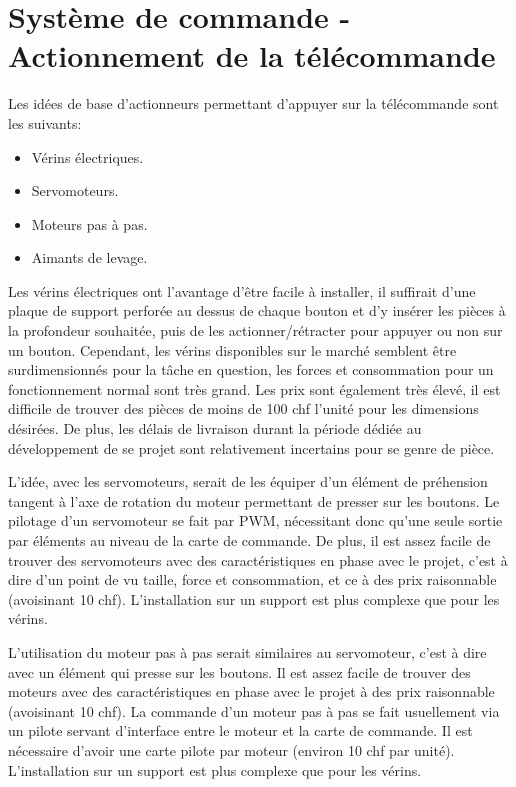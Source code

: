 \newpage
\section{Système de commande - Actionnement de la télécommande}
Les idées de base d'actionneurs permettant d'appuyer sur la télécommande sont les suivants:
\begin{itemize}
    \item Vérins électriques.
    \item Servomoteurs.
    \item Moteurs pas à pas.
    \item Aimants de levage.
\end{itemize}

Les vérins électriques ont l'avantage d'être facile à installer, il suffirait d'une plaque de support perforée au dessus de chaque bouton et d'y insérer
les pièces à la profondeur souhaitée, puis de les actionner/rétracter pour appuyer ou non sur un bouton. Cependant, les vérins disponibles sur le marché semblent être surdimensionnés pour la tâche en question, les forces et
consommation pour un fonctionnement normal sont très grand. Les prix sont également très élevé, il est difficile de trouver des pièces de moins de 100 \Gls{chf} l'unité
pour les dimensions désirées. De plus, les délais de livraison durant la période dédiée au développement de se projet sont relativement incertains pour se genre de pièce.

L'idée, avec les servomoteurs, serait de les équiper d'un élément de préhension tangent à l'axe de rotation du moteur permettant de presser sur les boutons.
Le pilotage d'un servomoteur se fait par PWM, nécessitant donc qu'une seule sortie par éléments au niveau de la carte de commande. De plus, il est assez facile de
trouver des servomoteurs avec des caractéristiques en phase avec le projet, c'est à dire d'un point de vu taille, force et consommation, et ce à des prix
raisonnable (avoisinant 10 \Gls{chf}). L'installation sur un support est plus complexe que pour les vérins.

L'utilisation du moteur pas à pas serait similaires au servomoteur, c'est à dire avec un élément qui presse sur les boutons.
Il est assez facile de trouver des moteurs avec des caractéristiques en phase avec le projet à des prix raisonnable (avoisinant 10 \Gls{chf}). La commande d'un moteur pas à pas
se fait usuellement via un pilote servant d'interface entre le moteur et la carte de commande. Il est nécessaire d'avoir une carte pilote par moteur (environ 10 \Gls{chf} par unité).
L'installation sur un support est plus complexe que pour les vérins.

